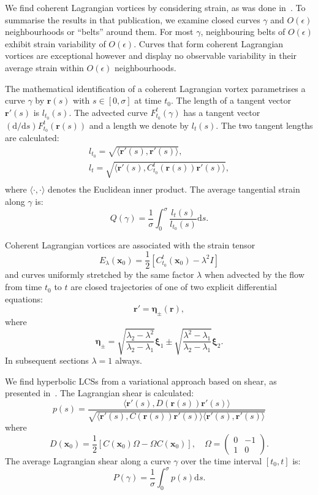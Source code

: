 \documentclass{article}
\begin{document}
We find coherent Lagrangian vortices by considering strain, as was done in~\textcite{haller13:_coher_lagran}. To summarise the results in that publication, we examine closed curves $\gamma$ and $O(\epsilon)$ neighbourhoods or ``belts'' around them. For most $\gamma$, neighbouring belts of $O(\epsilon)$ exhibit strain variability of $O(\epsilon)$. Curves that form coherent Lagrangian vortices are exceptional however and display no observable variability in their average strain within $O(\epsilon)$ neighbourhoods.

The mathematical identification of a coherent Lagrangian vortex para\-metrises a curve $\gamma$ by $\boldsymbol r(s)$ with $s \in [0,\sigma]$ at time $t_0$. The length of a tangent vector $\boldsymbol r'(s)$ is $l_{t_0}(s)$. The advected curve $F_{t_0}^t(\gamma)$ has a tangent vector $(\text{d}/\text{d}s) F_{t_0}^t(\boldsymbol r(s))$ and a length we denote by $l_t(s)$. The two tangent lengths are calculated:
\begin{gather*}
l_{t_0} = \sqrt{\langle \boldsymbol r'(s), \boldsymbol r'(s) \rangle},\\
l_t = \sqrt{\langle \boldsymbol r'(s), C_{t_0}^t(\boldsymbol r(s)) \boldsymbol r'(s) \rangle},\\
\end{gather*}
where $\langle \cdot, \cdot \rangle$ denotes the Euclidean inner product.
The average tangential strain along $\gamma$ is:
\[
Q(\gamma) = \frac{1}{\sigma} \int_0^\sigma \frac{l_t(s)}{l_{t_0}(s)}\text{d}s.
\]

Coherent Lagrangian vortices are associated with the strain tensor
\[
E_\lambda(\boldsymbol x_0) = \frac12 [C_{t_0}^t(\boldsymbol x_0) - \lambda^2 I]
\]
and curves uniformly stretched by the same factor $\lambda$ when advected by the flow from time $t_0$ to $t$ are closed trajectories of one of two explicit 
differential equations: 
\begin{equation}
\boldsymbol r' = \boldsymbol \eta_\pm(\boldsymbol r),
\label{e:etafields}
\end{equation}
where
\[
\boldsymbol \eta_\pm = \sqrt{\frac{\lambda_2 - \lambda^2}{\lambda_2 - \lambda_1}} \boldsymbol \xi_1 \pm \sqrt{\frac{\lambda^2 - \lambda_1}{\lambda_2 - \lambda_1}} \boldsymbol \xi_2.
\]
In subsequent sections $\lambda = 1$ always.

We find hyperbolic LCSs from a variational approach based on shear, as presented in~\textcite{farazmand13:_shearless}. The Lagrangian shear is calculated:
\[
p(s) = \frac{\langle \boldsymbol r'(s), D(\boldsymbol r(s)) \boldsymbol r'(s)\rangle}{\sqrt{\langle \boldsymbol r'(s), C(\boldsymbol r(s)) \boldsymbol r'(s)\rangle \langle \boldsymbol r'(s), \boldsymbol r'(s)\rangle}}
\]
where
\[
D(\boldsymbol x_0) = \frac12[C(\boldsymbol x_0) \Omega - \Omega C(\boldsymbol x_0)], \quad \Omega = \begin{pmatrix}0&-1\\1&0\end{pmatrix}.
\]
The average Lagrangian shear along a curve $\gamma$ over the time interval $[t_0,t]$ is:
\[
P(\gamma) = \frac{1}{\sigma} \int_0^\sigma p(s) \text{d}s.
\]
\end{document}
